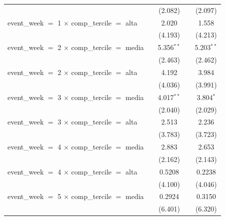 \begin{tabular}{lcccc}
                                                           &                & (2.082)       &              & (2.097)\\   
   event\_week $=$ 1 $\times$ comp\_tercile $=$ alta       &                & 2.020         &              & 1.558\\   
                                                           &                & (4.193)       &              & (4.213)\\   
   event\_week $=$ 2 $\times$ comp\_tercile $=$ media      &                & 5.356$^{**}$  &              & 5.203$^{**}$\\   
                                                           &                & (2.463)       &              & (2.462)\\   
   event\_week $=$ 2 $\times$ comp\_tercile $=$ alta       &                & 4.192         &              & 3.984\\   
                                                           &                & (4.036)       &              & (3.991)\\   
   event\_week $=$ 3 $\times$ comp\_tercile $=$ media      &                & 4.017$^{**}$  &              & 3.804$^{*}$\\   
                                                           &                & (2.040)       &              & (2.029)\\   
   event\_week $=$ 3 $\times$ comp\_tercile $=$ alta       &                & 2.513         &              & 2.236\\   
                                                           &                & (3.783)       &              & (3.723)\\   
   event\_week $=$ 4 $\times$ comp\_tercile $=$ media      &                & 2.883         &              & 2.653\\   
                                                           &                & (2.162)       &              & (2.143)\\   
   event\_week $=$ 4 $\times$ comp\_tercile $=$ alta       &                & 0.5208        &              & 0.2238\\   
                                                           &                & (4.100)       &              & (4.046)\\   
   event\_week $=$ 5 $\times$ comp\_tercile $=$ media      &                & 0.2924        &              & 0.3150\\   
                                                           &                & (6.401)       &              & (6.320)\\   

\end{tabular}
